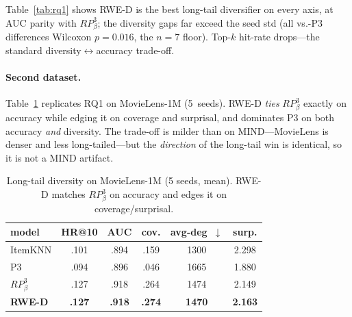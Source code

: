 \documentclass[sigconf,nonacm]{acmart}
\begin{document}
Table~\ref{tab:rq1} shows RWE-D is the best long-tail diversifier on every axis,
at AUC parity with $RP^3_\beta$; the diversity gaps far exceed the seed std (all
vs.-P3 differences Wilcoxon $p=0.016$, the $n{=}7$ floor). Top-$k$ hit-rate
drops---the standard diversity$\leftrightarrow$accuracy trade-off.

\paragraph{Second dataset.} Table~\ref{tab:movielens} replicates RQ1 on
MovieLens-1M (5~seeds). RWE-D \emph{ties} $RP^3_\beta$ exactly on accuracy while
edging it on coverage and surprisal, and dominates P3 on both accuracy
\emph{and} diversity. The trade-off is milder than on MIND---MovieLens is denser
and less long-tailed---but the \emph{direction} of the long-tail win is identical,
so it is not a MIND artifact.

\begin{table}[t]
  \centering
  \caption{Long-tail diversity on MovieLens-1M (5 seeds, mean). RWE-D matches
  $RP^3_\beta$ on accuracy and edges it on coverage/surprisal.}
  \label{tab:movielens}
  \small
  \begin{tabular}{lccccc}
    \toprule
    model & HR@10 & AUC & cov. & avg-deg~$\downarrow$ & surp. \\
    \midrule
    ItemKNN & .101 & .894 & .159 & 1300 & 2.298 \\
    P3      & .094 & .896 & .046 & 1665 & 1.880 \\
    $RP^3_\beta$ & .127 & .918 & .264 & 1474 & 2.149 \\
    \textbf{RWE-D} & \textbf{.127} & \textbf{.918} & \textbf{.274} & \textbf{1470} & \textbf{2.163} \\
    \bottomrule
  \end{tabular}
\end{table}
\end{document}

